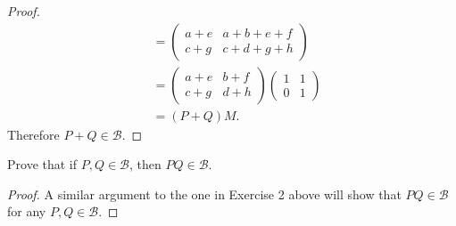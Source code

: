 \begin{proof}
\begin{align*}
             &= \begin{pmatrix}
               a + e & a + b + e + f \\
               c + g & c + d + g + h
             \end{pmatrix} \\
             &= \begin{pmatrix}
               a + e & b + f \\
               c + g & d + h
             \end{pmatrix}
               \begin{pmatrix}
                 1 & 1 \\ 0 & 1
               \end{pmatrix} \\
             &= (P + Q)M.
  \end{align*}
  Therefore $P + Q\in\mathcal{B}$.
\end{proof}

Prove that if $P, Q\in\mathcal{B}$, then $PQ\in\mathcal{B}$.
\begin{proof}
  A similar argument to the one in Exercise 2 above will show that
  $PQ\in\mathcal{B}$ for any $P,Q\in\mathcal{B}$.
\end{proof}

